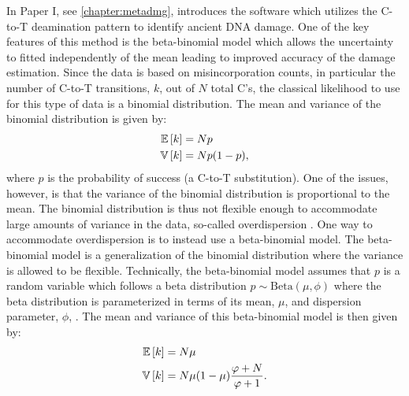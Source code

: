 In Paper I, see \autoref{chapter:metadmg}, introduces the \metaDMG software which utilizes the C-to-T deamination pattern to identify ancient DNA damage. One of the key features of this method is the beta-binomial model which allows the uncertainty to fitted independently of the mean leading to improved accuracy of the damage estimation. Since the data is based on misincorporation counts, in particular the number of C-to-T transitions, $k$, out of $N$ total C's, the classical likelihood to use for this type of data is a binomial distribution. The mean and variance of the binomial distribution is given by:
\begin{equation}
    \begin{split}
        \mathbb{E}\left[{k}\right]  &= N p \\
        \mathbb{V}\left[{k}\right] &= Np(1-p),
        \label{eq:Binomial_expectation_variance}
    \end{split}
\end{equation}
where $p$ is the probability of success (a C-to-T substitution). One of the issues, however, is that the variance of the binomial distribution is proportional to the mean. The binomial distribution is thus not flexible enough to accommodate large amounts of variance in the data, so-called overdispersion \autocite{mcelreathStatisticalRethinkingBayesian2020}. One way to accommodate overdispersion is to instead use a beta-binomial model. The beta-binomial model is a generalization of the binomial distribution where the variance is allowed to be flexible. Technically, the beta-binomial model assumes that $p$ is a random variable which follows a beta distribution $p \sim \mathrm{Beta}(\mu, \phi)$ where the beta distribution is parameterized in terms of its mean, $\mu$, and dispersion parameter, $\phi$, \autocite{cepeda-cuervoDoubleGeneralizedBetaBinomial2017}. The mean and variance of this beta-binomial model is then given by:
\begin{equation}
    \begin{split}
        \mathbb{E}\left[{k}\right]  &= N \mu \\
        \mathbb{V}\left[{k}\right] &= N\mu(1-\mu) \frac{\varphi+N}{\varphi+1}.
        \label{eq:BetaBinomial_expectation_variance}
    \end{split}
\end{equation}

